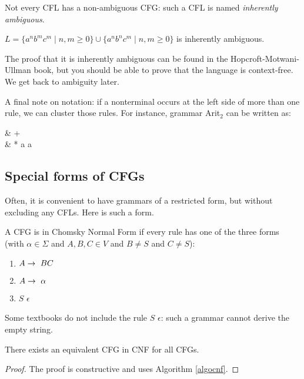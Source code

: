 Not every CFL has a non-ambiguous CFG: such a CFL is named {\em inherently ambiguous}.
\begin{example}
	$L = \{a^nb^mc^m \mid n,m \geq 0\} \cup \{a^nb^nc^m \mid n,m \geq 0\}$ is inherently ambiguous.
\end{example}
The proof that it is inherently ambiguous can be found in the Hopcroft-Motwani-Ullman book,
but you should be able to prove that the language is context-free.
We get back to ambiguity later.

A final note on notation: if a nonterminal occurs at the left side of
more than one rule, we can cluster those rules. For instance, grammar
Arit${}_2$ can be written as:
\begin{grammar*}
  &\rpijl {} +  \mid {}\\
  &\rpijl {} * a \mid a
\end{grammar*}

\subsection{Special forms of CFGs}
Often, it is convenient to have grammars of a restricted form, but
without excluding any CFLs. Here is such a form.

\begin{definition}
A CFG is in Chomsky Normal Form if every rule has one of the three
forms (with $\alpha\in \Sigma$ and $A,B,C\in V$ and $B \neq S$ and $C\neq S$):
\begin{enumerate}
	\item $A \rightarrow~ BC$
	\item $A \rightarrow~ \alpha$
	\item $S$ \rpijl $\epsilon$
\end{enumerate}
\end{definition}

Some textbooks do not include the rule $S$ \rpijl $\epsilon$: such a grammar
cannot derive the empty string.

\begin{theorem} \label{chomskynormalform}
There exists an equivalent CFG in CNF for all CFGs.
\end{theorem}
\begin{proof}
The proof is constructive and uses Algorithm \ref{algocnf}.
\end{proof}

